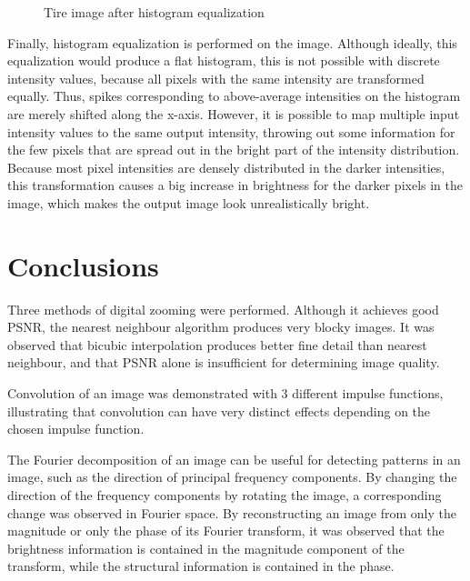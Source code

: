 \documentclass{sydeStyle}
\begin{document}
 \begin{figure}
	\begin{center}
	\end{center}
	\caption{Tire image after histogram equalization}
\end{figure}
Finally, histogram equalization is performed on the image.
Although ideally, this equalization would produce a flat histogram, this is not
possible with discrete intensity values, because all pixels with the same
intensity are transformed equally.
Thus, spikes corresponding to above-average intensities on the histogram are
merely shifted along the x-axis.
However, it is possible to map multiple input intensity values to the same
output intensity, throwing out some information for the few pixels that are
spread out in the bright part of the intensity distribution.
Because most pixel intensities are densely distributed in the darker
intensities, this transformation causes a big increase in brightness for the
darker pixels in the image, which makes the output image look unrealistically
bright.

\section*{Conclusions}
Three methods of digital zooming were performed.  Although it achieves good
PSNR, the nearest neighbour algorithm produces very blocky images.  It was
observed that bicubic interpolation produces better fine detail than
nearest neighbour, and that PSNR alone is insufficient for determining image
quality.

Convolution of an image was demonstrated with 3 different impulse functions,
illustrating that convolution can have very distinct effects depending on the
chosen impulse function.

The Fourier decomposition of an image can be useful for detecting patterns
in an image, such as the direction of principal frequency components.
By changing the direction of the frequency components by rotating the image,
a corresponding change was observed in Fourier space.
By reconstructing an image from only the magnitude or only the phase of its
Fourier transform, it was observed that the brightness information is contained
in the magnitude component of the transform, while the structural information
is contained in the phase.
\end{document}
